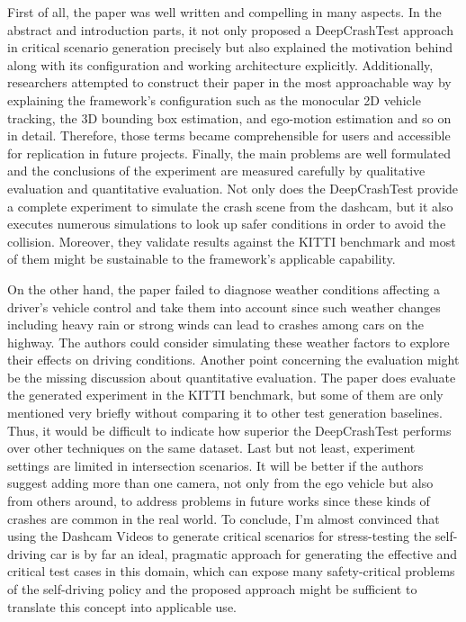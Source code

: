 \documentclass[10pt,a4paper]{report}
\begin{document}
%
First of all, the paper was well written and compelling in many aspects. In the abstract and introduction parts, it not only proposed a DeepCrashTest approach in critical scenario generation precisely but also explained the motivation behind along with its configuration and working architecture explicitly.
%
Additionally, researchers attempted to construct their paper in the most approachable way by explaining the framework's configuration such as the monocular 2D vehicle tracking, the 3D bounding box estimation, and ego-motion estimation and so on in detail.
%
Therefore, those terms became comprehensible for users and accessible for replication in future projects.
%
Finally, the main problems are well formulated and the conclusions of the experiment are measured carefully by qualitative evaluation and quantitative evaluation. 
%
Not only does the DeepCrashTest provide a complete experiment to simulate the crash scene from the dashcam, but it also executes numerous simulations to look up safer conditions in order to avoid the collision.
%
Moreover, they validate results against the KITTI benchmark and most of them might be sustainable to the framework's applicable capability.
%

On the other hand, the paper failed to diagnose weather conditions affecting a driver's vehicle control and take them into account since such weather changes including heavy rain or strong winds can lead to crashes among cars on the highway.
%
The authors could consider simulating these weather factors to explore their effects on driving conditions.
%
Another point concerning the evaluation might be the missing discussion about quantitative evaluation.
%
The paper does evaluate the generated experiment in the KITTI benchmark, but some of them are only mentioned very briefly without comparing it to other test generation baselines.
%
Thus, it would be difficult to indicate how superior the DeepCrashTest performs over other techniques on the same dataset.
%
Last but not least, experiment settings are limited in intersection scenarios. 
%
It will be better if the authors suggest adding more than one camera, not only from the ego vehicle but also from others around, to address problems in future works since these kinds of crashes are common in the real world.
%
To conclude, I’m almost convinced that using the Dashcam Videos to generate critical scenarios for stress-testing the self-driving car is by far an ideal, pragmatic approach for generating the effective and critical test cases in this domain, which can expose many safety-critical problems of the self-driving policy and the proposed approach might be sufficient to translate this concept into applicable use.
\end{document}

